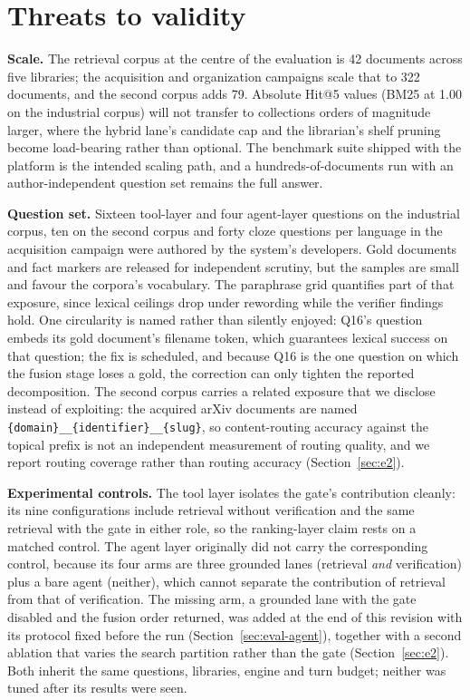 \section{Threats to validity}
\label{sec:threats}

\noindent\textbf{Scale.} The retrieval corpus at the centre of the evaluation
is 42 documents across five libraries; the acquisition and organization
campaigns scale that to 322 documents, and the second corpus adds 79. Absolute
Hit@5 values (BM25 at 1.00 on the industrial corpus) will not transfer to
collections orders of magnitude larger, where the hybrid lane's candidate cap
and the librarian's shelf pruning become load-bearing rather than optional.
The benchmark suite shipped with the platform is the intended scaling path,
and a hundreds-of-documents run with an author-independent question set
remains the full answer.

\noindent\textbf{Question set.} Sixteen tool-layer and four agent-layer
questions on the industrial corpus, ten on the second corpus and forty cloze
questions per language in the acquisition campaign were authored by the
system's developers. Gold documents and fact markers are released for
independent scrutiny, but the samples are small and favour the corpora's
vocabulary. The paraphrase grid quantifies part of that exposure, since
lexical ceilings drop under rewording while the verifier findings hold. One
circularity is named rather than silently enjoyed: Q16's question embeds its
gold document's filename token, which guarantees lexical success on that
question; the fix is scheduled, and because Q16 is the one question on which
the fusion stage loses a gold, the correction can only tighten the reported
decomposition. The second corpus carries a related exposure that we disclose
instead of exploiting: the acquired arXiv documents are named
\texttt{\{domain\}\_\_\{identifier\}\_\_\{slug\}}, so content-routing accuracy
against the topical prefix is not an independent measurement of routing
quality, and we report routing coverage rather than routing accuracy
(Section~\ref{sec:e2}).

\noindent\textbf{Experimental controls.} The tool layer isolates the gate's
contribution cleanly: its nine configurations include retrieval without
verification and the same retrieval with the gate in either role, so the
ranking-layer claim rests on a matched control. The agent layer originally did
not carry the corresponding control, because its four arms are three grounded
lanes (retrieval \emph{and} verification) plus a bare agent (neither), which
cannot separate the contribution of retrieval from that of verification. The
missing arm, a grounded lane with the gate disabled and the fusion order
returned, was added at the end of this revision with its protocol fixed before
the run (Section~\ref{sec:eval-agent}), together with a second ablation that
varies the search partition rather than the gate
(Section~\ref{sec:e2}). Both inherit the same questions, libraries,
engine and turn budget; neither was tuned after its results were seen.

